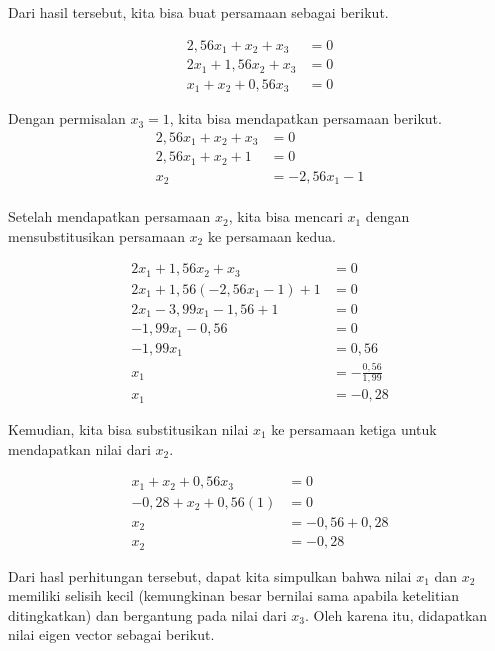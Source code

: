 \documentclass{article}
\begin{document}
\setcounter{equation}{0}

Dari hasil tersebut, kita bisa buat persamaan sebagai berikut.

\begin{align}
    2,56x_1 + x_2 + x_3 &= 0\\
    2x_1 + 1,56x_2 + x_3 &= 0\\
    x_1 + x_2 +0,56x_3 &= 0
\end{align}

Dengan permisalan $x_3 = 1$, kita bisa mendapatkan persamaan berikut.
\begin{align*}
    2,56x_1 + x_2 + x_3 &= 0\\
    2,56x_1 + x_2 + 1 &= 0\\
    x_2 &= - 2,56x_1 - 1\\    
\end{align*}

Setelah mendapatkan persamaan $x_2$, kita bisa mencari $x_1$ dengan mensubstitusikan persamaan $x_2$ ke persamaan kedua.

\begin{align*}
    2x_1 + 1,56x_2 + x_3 &= 0\\
    2x_1 + 1,56(- 2,56x_1 - 1) + 1 &= 0\\
    2x_1  - 3,99x_1 - 1,56 + 1 &= 0\\
    -1,99x_1 - 0,56 &= 0\\
    -1,99x_1 &= 0,56\\
    x_1 &= -\frac{0,56}{1,99}\\
    x_1 &= -0,28
\end{align*}

Kemudian, kita bisa substitusikan nilai $x_1$ ke persamaan ketiga untuk mendapatkan nilai dari $x_2$.

\begin{align*}
    x_1 + x_2 +0,56x_3 &= 0\\
    -0,28 + x_2 + 0,56(1) &= 0\\
    x_2 &= -0,56 + 0,28\\
    x_2 &= -0,28
\end{align*}

Dari hasl perhitungan tersebut, dapat kita simpulkan bahwa nilai $x_1$ dan $x_2$ memiliki selisih kecil (kemungkinan besar bernilai sama apabila ketelitian ditingkatkan) dan bergantung pada nilai dari $x_3$. Oleh karena itu, didapatkan nilai eigen vector sebagai berikut.
\end{document}
